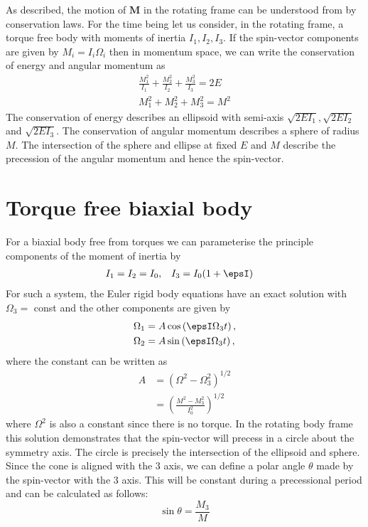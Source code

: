 \documentclass[/home/greg/Thesis/main/main.tex]{subfiles}
\begin{document}
\graphicspath{{/home/greg/Neutron_star_modelling/MotionOfARigidBody}}
\newcommand{\MotionOfARigidBodyDir}{/home/greg/Neutron_star_modelling/MotionOfARigidBody}

\FloatBarrier
As \citet{Landau1969} described, the motion of $\mathbf{M}$ in the rotating frame
can be understood from by conservation laws. For the time being let us consider,
in the rotating frame, a torque free body with moments of inertia $I_{1}, I_{2}, I_{3}$. 
If the spin-vector components are given by $M_{i} = I_{i} \Omega_{i}$ then 
in momentum space, we can write the conservation of energy and angular momentum as
\begin{align}
    \frac{M_{1}^{2}}{I_{1}} + \frac{M_{2}^{2}}{I_{2}} + \frac{M_{3}^{2}}{I_{3}} = 2E 
    \label{eqn: ellipse} \\
    M_{1}^{2} + M_{2}^{2} + M_{3}^{2} = M^{2}
    \label{eqn: sphere}
\end{align}
The conservation of energy describes an ellipsoid with semi-axis
$\sqrt{2EI_{1}}, \sqrt{2EI_{2}}$ and $\sqrt{2EI_{3}}$. The conservation of 
angular momentum describes a sphere of radius $M$. The intersection of the
sphere and ellipse at fixed $E$ and $M$ describe the precession of the angular
momentum and hence the spin-vector.

\section{Torque free biaxial body}
For a biaxial body free from torques we can parameterise the principle components
of the moment of inertia by 
\begin{align}
    I_{1} = I_{2} = I_{0}, &&& I_{3} = I_{0}(1 + \epsI)
\end{align}
For such a system, the Euler rigid body equations have an
exact solution with $\Omega_{3}=$ const and the other components are given by
\begin{align}
    \Omega_{1} &= A\cos\left(\epsI \Omega_{3} t\right),\\
    \Omega_{2} &= A\sin\left(\epsI \Omega_{3} t\right),
\end{align}
where the constant can be written as
\begin{align}
    A & = \left(\Omega^{2} - \Omega_{3}^{2}\right)^{1/2}\\
      & = \left(\frac{M^{2} - M_{3}^{2}}{I_{0}^{2}}\right)^{1/2}
\end{align}
where $\Omega^{2}$ is also a constant since there is no torque. In the rotating
body frame this solution demonstrates that the spin-vector will precess in a
circle about the symmetry axis. The circle is precisely the intersection of the
ellipsoid and sphere. Since the cone is aligned with the $3$ axis, we can define
a polar angle $\theta$ made by the spin-vector with the $3$ axis. This will be 
constant during a precessional period and can be calculated as follows:
\begin{equation}
\sin\theta = \frac{M_{3}}{M}
\label{eqn: sin theta}
\end{equation}
\end{document}
